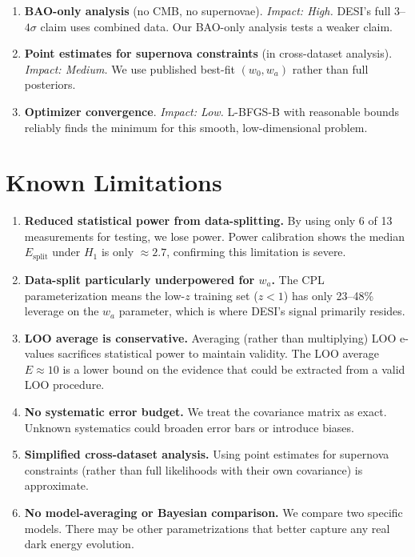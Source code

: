 \documentclass[11pt,a4paper]{article}
\begin{document}
\begin{enumerate}[resume]
    \item \textbf{BAO-only analysis} (no CMB, no supernovae). \textit{Impact: High.} DESI's full $3$--$4\sigma$ claim uses combined data. Our BAO-only analysis tests a weaker claim.
    \item \textbf{Point estimates for supernova constraints} (in cross-dataset analysis). \textit{Impact: Medium.} We use published best-fit $(w_0, w_a)$ rather than full posteriors.
    \item \textbf{Optimizer convergence}. \textit{Impact: Low.} L-BFGS-B with reasonable bounds reliably finds the minimum for this smooth, low-dimensional problem.
\end{enumerate}


\section{Known Limitations}

\begin{enumerate}
    \item \textbf{Reduced statistical power from data-splitting.} By using only 6 of 13 measurements for testing, we lose power. Power calibration shows the median $E_{\text{split}}$ under $H_1$ is only $\approx 2.7$, confirming this limitation is severe.

    \item \textbf{Data-split particularly underpowered for $w_a$.} The CPL parameterization means the low-$z$ training set ($z < 1$) has only 23--48\% leverage on the $w_a$ parameter, which is where DESI's signal primarily resides.

    \item \textbf{LOO average is conservative.} Averaging (rather than multiplying) LOO e-values sacrifices statistical power to maintain validity. The LOO average $E \approx 10$ is a lower bound on the evidence that could be extracted from a valid LOO procedure.

    \item \textbf{No systematic error budget.} We treat the covariance matrix as exact. Unknown systematics could broaden error bars or introduce biases.

    \item \textbf{Simplified cross-dataset analysis.} Using point estimates for supernova constraints (rather than full likelihoods with their own covariance) is approximate.

    \item \textbf{No model-averaging or Bayesian comparison.} We compare two specific models. There may be other parametrizations that better capture any real dark energy evolution.
\end{enumerate}
\end{document}
